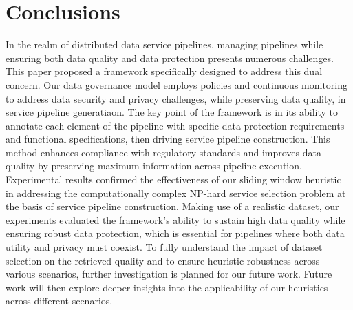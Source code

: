 \documentclass[sn-mathphys-num,referee]{sn-jnl}
\theoremstyle{definition}
\begin{document}
\section{Conclusions}\label{sec:conclusions}
In the realm of distributed data service pipelines, managing pipelines while ensuring both data quality and data protection presents numerous challenges. This paper proposed a framework specifically designed to address this dual concern. Our data governance model employs policies and continuous monitoring to address data security and privacy challenges, while preserving data quality, in service pipeline generatiaon. The key point of the framework is in its ability to annotate each element of the pipeline with specific data protection requirements and functional specifications, then driving service pipeline construction. This method enhances compliance with regulatory standards and improves data quality by preserving maximum information across pipeline execution. Experimental results confirmed the effectiveness of our sliding window heuristic in addressing the computationally complex NP-hard service selection problem at the basis of service pipeline construction. Making use of a realistic dataset, our experiments evaluated the framework's ability to sustain high data quality while ensuring robust data protection, which is essential for pipelines where both data utility and privacy must coexist. To fully understand the impact of dataset selection on the retrieved quality and to ensure heuristic robustness across various scenarios, further investigation is planned for our future work. Future work will then %
explore deeper insights into the applicability of our heuristics across different scenarios.
\end{document}
